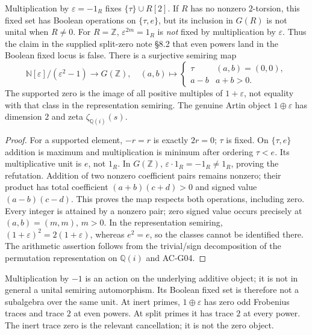 \begin{proposition}
\label{AC-G08}
Multiplication by $\varepsilon=-1_R$ fixes
$\{\tau\}\cup R[2]$.  If $R$ has no nonzero $2$-torsion, this fixed set
has Boolean operations on $\{\tau,e\}$, but its inclusion in $G(R)$
is not unital when $R\ne0$.  For $R=\mathbb Z$,
$\varepsilon^{2m}=1_R$ is \emph{not} fixed by multiplication by
$\varepsilon$.  Thus the claim in the supplied split-zero note \S8.2
that even powers land in the Boolean fixed locus is false.
There is a surjective semiring map
\[
 \mathbb N[\varepsilon]/(\varepsilon^2-1)\longrightarrow G(\mathbb Z),
 \quad (a,b)\longmapsto
 \begin{cases}\tau&(a,b)=(0,0),\\a-b& a+b>0.
 \end{cases}
\]
The supported zero is the image of all positive multiples of
$1+\varepsilon$, not equality with that class in the representation
semiring.  The genuine Artin object $1\oplus\varepsilon$ has dimension
$2$ and zeta $\zeta_{\mathbb Q(i)}(s)$.
\end{proposition}
\begin{proof}
For a supported element, $-r=r$ is exactly $2r=0$; $\tau$ is fixed.
On $\{\tau,e\}$ addition is maximum and multiplication is minimum after
ordering $\tau<e$.  Its multiplicative unit is $e$, not $1_R$.
In $G(\mathbb Z)$, $\varepsilon\cdot1_R=-1_R\ne1_R$, proving the
refutation.  Addition of two nonzero coefficient pairs remains nonzero;
their product has total coefficient $(a+b)(c+d)>0$ and signed value
$(a-b)(c-d)$.  This proves the map respects both operations, including
zero.  Every integer is attained by a nonzero pair; zero signed value
occurs precisely at $(a,b)=(m,m)$, $m>0$.
In the representation semiring, $(1+\varepsilon)^2=2(1+\varepsilon)$,
whereas $e^2=e$, so the classes cannot be identified there.
The arithmetic assertion follows from the trivial/sign decomposition
of the permutation representation on $\mathbb Q(i)$ and AC-G04.
\end{proof}

Multiplication by $-1$ is an action on the underlying additive object;
it is not in general a unital semiring automorphism.  Its Boolean fixed
set is therefore not a subalgebra over the same unit.  At inert primes,
$1\oplus\varepsilon$ has zero odd Frobenius traces and trace $2$ at even
powers.  At split primes it has trace $2$ at every power.  The inert trace
zero is the relevant cancellation; it is not the zero object.

